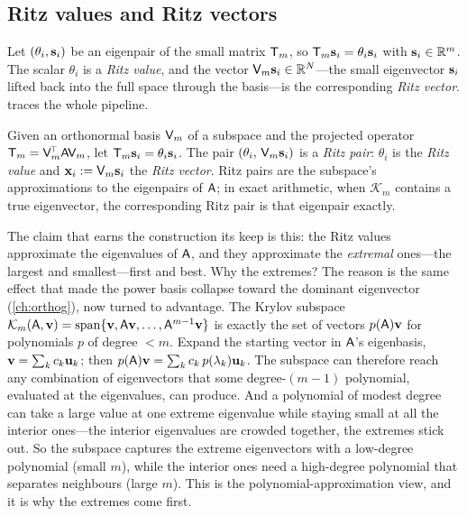\subsection{Ritz values and Ritz vectors}

Let $(\theta_i, \mathbf{s}_i)$ be an eigenpair of the small matrix $\mathsf{T}_m$, so
$\mathsf{T}_m\mathbf{s}_i = \theta_i\mathbf{s}_i$ with $\mathbf{s}_i \in \mathbb{R}^m$. The scalar $\theta_i$ is a
\emph{Ritz value}, and the vector $\mathsf{V}_m\mathbf{s}_i \in \mathbb{R}^N$---the small eigenvector
$\mathbf{s}_i$ lifted back into the full space through the basis---is the corresponding
\emph{Ritz vector}.  traces the whole pipeline.

\begin{definition}
\label{def:ritz}
Given an orthonormal basis $\mathsf{V}_m$ of a subspace and the projected operator
$\mathsf{T}_m = \mathsf{V}_m^{\!\top}\mathsf{A}\mathsf{V}_m$, let $\mathsf{T}_m\mathbf{s}_i = \theta_i\mathbf{s}_i$.
The pair $(\theta_i,\, \mathsf{V}_m\mathbf{s}_i)$ is a \emph{Ritz pair}: $\theta_i$ is the
\emph{Ritz value} and $\mathbf{x}_i := \mathsf{V}_m\mathbf{s}_i$ the \emph{Ritz vector}. Ritz pairs are
the subspace's approximations to the eigenpairs of $\mathsf{A}$; in exact arithmetic, when
$\mathcal{K}_m$ contains a true eigenvector, the corresponding Ritz pair is that
eigenpair exactly.
\end{definition}

The claim that earns the construction its keep is this: the Ritz values approximate the
eigenvalues of $\mathsf{A}$, and they approximate the \emph{extremal} ones---the largest
and smallest---first and best. Why the extremes? The reason is the same effect that made
the power basis collapse toward the dominant eigenvector (\cref{ch:orthog}), now turned
to advantage. The Krylov subspace $\mathcal{K}_m(\mathsf{A}, \mathbf{v}) =
\operatorname{span}\{\mathbf{v}, \mathsf{A}\mathbf{v}, \dots, \mathsf{A}^{m-1}\mathbf{v}\}$ is exactly the set of
vectors $p(\mathsf{A})\mathbf{v}$ for polynomials $p$ of degree $< m$. Expand the starting vector
in $\mathsf{A}$'s eigenbasis, $\mathbf{v} = \sum_k c_k\mathbf{u}_k$; then $p(\mathsf{A})\mathbf{v} = \sum_k
c_k\,p(\lambda_k)\mathbf{u}_k$. The subspace can therefore reach any combination of eigenvectors
that some degree-$(m{-}1)$ polynomial, evaluated at the eigenvalues, can produce. And a
polynomial of modest degree can take a large value at one extreme eigenvalue while
staying small at all the interior ones---the interior eigenvalues are crowded together,
the extremes stick out. So the subspace captures the extreme eigenvectors with a
low-degree polynomial (small $m$), while the interior ones need a high-degree polynomial
that separates neighbours (large $m$). This is the polynomial-approximation view, and it
is why the extremes come first.

